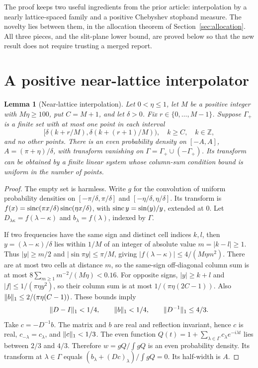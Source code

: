 \documentclass[11pt,letterpaper]{article}
\newtheorem{lemma}[theorem]{Lemma}
\theoremstyle{remark}\newtheorem{remark}[theorem]{Remark}
\begin{document}
The proof keeps two useful ingredients from the prior article: interpolation by a nearly lattice-spaced family and a positive Chebyshev stopband measure. The novelty lies between them, in the allocation theorem of Section~\ref{sec:allocation}. All three pieces, and the slit-plane lower bound, are proved below so that the new result does not require trusting a merged report.

\section{A positive near-lattice interpolator}\label{sec:interpol}
\begin{lemma}[Near-lattice interpolation]\label{lem:phase}
Let $0<\eta\le1$, let $M$ be a positive integer with $M\eta\ge100$, put $C=M+1$, and let $\delta>0$. Fix $r\in\{0,\ldots,M-1\}$. Suppose $\Gamma_+$ is a finite set with at most one point in each interval
\begin{equation}\label{eq:phase}
 [\delta(k+r/M),\delta(k+(r+1)/M)),\quad k\ge C,\quad k\in\mathbb Z,
\end{equation}
and no other points. There is an even probability density on $[-A,A]$, $A=(\pi+\eta)/\delta$, with transform vanishing on $\Gamma=\Gamma_+\cup(-\Gamma_+)$. Its transform can be obtained by a finite linear system whose column-sum condition bound is uniform in the number of points.
\end{lemma}
\begin{proof}
The empty set is harmless. Write $g$ for the convolution of uniform probability densities on $[-\pi/\delta,\pi/\delta]$ and $[-\eta/\delta,\eta/\delta]$. Its transform is $f(x)=\operatorname{sinc}(\pi x/\delta)\operatorname{sinc}(\eta x/\delta)$, with $\operatorname{sinc} y=\sin(y)/y$, extended at $0$. Let $D_{\lambda\kappa}=f(\lambda-\kappa)$ and $b_\lambda=f(\lambda)$, indexed by $\Gamma$.

If two frequencies have the same sign and distinct cell indices $k,l$, then $y=(\lambda-\kappa)/\delta$ lies within $1/M$ of an integer of absolute value $m=|k-l|\ge1$. Thus $|y|\ge m/2$ and $|\sin\pi y|\le\pi/M$, giving
$|f(\lambda-\kappa)|\le 4/(M\eta m^2)$.
There are at most two cells at distance $m$, so the same-sign off-diagonal column sum is at most $8\sum_{m\ge1}m^{-2}/(M\eta)<0.16$. For opposite signs, $|y|\ge k+l$ and $|f|\le1/(\pi\eta y^2)$, so their column sum is at most $1/(\pi\eta(2C-1))$. Also $\lVert b\rVert_1\le2/(\pi\eta(C-1))$. These bounds imply
\[
 \lVert D-I\rVert_1<1/4,\qquad \lVert b\rVert_1<1/4,\qquad
 \lVert D^{-1}\rVert_1\le4/3.
\]
Take $c=-D^{-1}b$. The matrix and $b$ are real and reflection invariant, hence $c$ is real, $c_{-\lambda}=c_\lambda$, and $\lVert c\rVert_1<1/3$. The even function
$Q(t)=1+\sum_{\lambda\in\Gamma}c_\lambda e^{-i\lambda t}$ lies between $2/3$ and $4/3$. Therefore $w=gQ/\int gQ$ is an even probability density. Its transform at $\lambda\in\Gamma$ equals $(b_\lambda+(Dc)_\lambda)/\int gQ=0$. Its half-width is $A$.
\end{proof}
\end{document}
